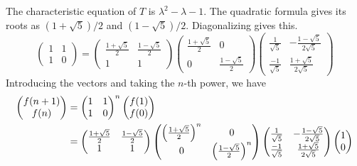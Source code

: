 The characteristic equation of $T$ is $\lambda^2-\lambda-1$.
The quadratic formula gives its roots as $(1+\sqrt{5})/2$ and 
$(1-\sqrt{5})/2$. 
Diagonalizing gives this.
\begin{equation*}
  \begin{pmatrix}
    1  &1  \\
    1  &0
  \end{pmatrix}
  =\begin{pmatrix}
     \frac{1+\sqrt{5}}{2}  &\frac{1-\sqrt{5}}{2} \\
     1                     &1
   \end{pmatrix}
   \begin{pmatrix}
     \frac{1+\sqrt{5}}{2}  &0   \\
     0                     &\frac{1-\sqrt{5}}{2}
   \end{pmatrix}
   \begin{pmatrix}
     \frac{1}{\sqrt{5}}     &-\frac{1-\sqrt{5}}{2\sqrt{5}}  \\
     \frac{-1}{\sqrt{5}}    &\frac{1+\sqrt{5}}{2\sqrt{5}}       
   \end{pmatrix}
\end{equation*} 
Introducing the vectors and taking the $n$-th power, we have
\begin{align*}
  \begin{pmatrix} f(n+1) \\ f(n) \end{pmatrix}
  &=\begin{pmatrix}
    1  &1  \\
    1  &0
  \end{pmatrix}^n
  \begin{pmatrix} f(1) \\ f(0) \end{pmatrix}                                          \\
  &=\begin{pmatrix}
     \frac{1+\sqrt{5}}{2}  &\frac{1-\sqrt{5}}{2} \\
     1                     &1
   \end{pmatrix}
   \begin{pmatrix}
     \left(\frac{1+\sqrt{5}}{2}\right)^n  &0   \\
     0                                    &\left(\frac{1-\sqrt{5}}{2}\right)^n
   \end{pmatrix}
   \begin{pmatrix}
     \frac{1}{\sqrt{5}}     &-\frac{1-\sqrt{5}}{2\sqrt{5}}  \\
     \frac{-1}{\sqrt{5}}    &\frac{1+\sqrt{5}}{2\sqrt{5}}       
   \end{pmatrix}
  \begin{pmatrix} 1 \\ 0 \end{pmatrix}                                             
\end{align*}
